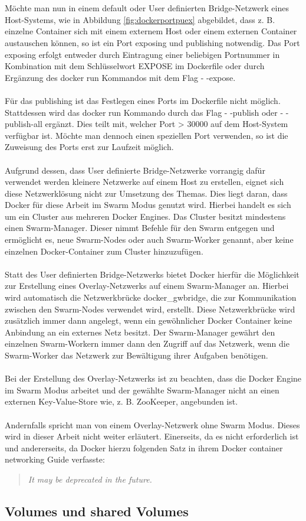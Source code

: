 \\\\
Möchte man nun in einem default oder User definierten Bridge-Netzwerk eines Host-Systems, wie in Abbildung \ref{fig:dockerportpuex} abgebildet, dass z. B. einzelne Container sich mit einem externem Host oder einem externen Container austauschen können, so ist ein Port exposing und publishing notwendig. Das Port exposing erfolgt entweder durch Eintragung einer beliebigen Portnummer in Kombination mit dem Schlüsselwort EXPOSE im Dockerfile oder durch Ergänzung des docker run Kommandos mit dem Flag - -expose.
\\\\
Für das publishing ist das Festlegen eines Ports im Dockerfile nicht möglich. Stattdessen wird das docker run Kommando durch das Flag - -publish oder - -publish-all ergänzt. Dies teilt mit, welcher Port > 30000 auf dem Host-System verfügbar ist. Möchte man dennoch einen speziellen Port verwenden, so ist die Zuweisung des Ports erst zur Laufzeit möglich.
\\\\
Aufgrund dessen, dass User definierte Bridge-Netzwerke vorrangig dafür verwendet werden kleinere Netzwerke auf einem Host zu erstellen, eignet sich diese Netzwerklösung nicht zur Umsetzung des Themas. Dies liegt daran, dass Docker für diese Arbeit im Swarm Modus genutzt wird. Hierbei handelt es sich um ein Cluster aus mehreren Docker Engines. Das Cluster besitzt mindestens einen Swarm-Manager. Dieser nimmt Befehle für den Swarm entgegen und ermöglicht es, neue Swarm-Nodes oder auch Swarm-Worker genannt, aber keine einzelnen Docker-Container zum Cluster hinzuzufügen.
\\\\
Statt des User definierten Bridge-Netzwerks bietet Docker hierfür die Möglichkeit zur Erstellung eines Overlay-Netzwerks auf einem Swarm-Manager an. Hierbei wird automatisch die Netzwerkbrücke docker\_gwbridge, die zur Kommunikation zwischen den Swarm-Nodes verwendet wird, erstellt. Diese Netzwerkbrücke wird zusätzlich immer dann angelegt, wenn ein gewöhnlicher Docker Container keine Anbindung an ein externes Netz besitzt. Der Swarm-Manager gewährt den einzelnen Swarm-Workern immer dann den Zugriff auf das Netzwerk, wenn die Swarm-Worker das Netzwerk zur Bewältigung ihrer Aufgaben benötigen. 
\\\\
Bei der Erstellung des Overlay-Netzwerks ist zu beachten, dass die Docker Engine im Swarm Modus arbeitet und der gewählte Swarm-Manager nicht an einen externen Key-Value-Store wie, z. B. ZooKeeper, angebunden ist.
\\\\
Andernfalls spricht man von einem Overlay-Netzwerk ohne Swarm Modus. Dieses wird in dieser Arbeit nicht weiter erläutert. Einerseits, da es nicht erforderlich ist und andererseits, da Docker hierzu folgenden Satz in ihrem Docker container networking Guide verfasste:
\begin{quote}
	\textit{\grqq It may be deprecated in the future. \grqq}
\end{quote}
\subsection{Volumes und shared Volumes}
